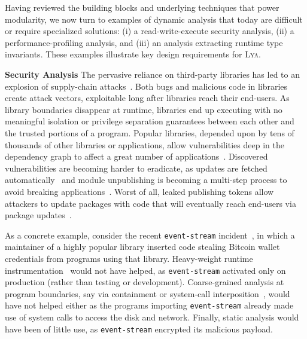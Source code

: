 \documentclass[letterpaper,twocolumn,10pt]{article}
\newcommand{\heading}[1]{\vspace{2pt}\noindent\textbf{#1}\enspace}
\newcommand{\ttt}[1]{\texttt{#1}}
\newcommand{\sys}{{\scshape Lya}\xspace}
\begin{document}

Having reviewed the building blocks and underlying techniques that power modularity, we now turn to examples of dynamic analysis that today are difficult or require specialized solutions:
  (i) a read-write-execute security analysis,
  (ii) a performance-profiling analysis, and %
  (iii) an analysis extracting runtime type invariants.
These examples illustrate key design requirements for \sys.

\heading{Security Analysis}
The pervasive reliance on third-party libraries has led to an explosion of supply-chain attacks~\cite{long2015owasp, maass2016theory, snyk, lauinger2017thou}.
Both bugs and malicious code in libraries create attack vectors, exploitable long after libraries reach their end-users.
As library boundaries disappear at runtime, libraries end up executing with no meaningful isolation or privilege separation guarantees between each other and the trusted portions of a program.
Popular libraries, depended upon by tens of thousands of other libraries or applications, allow vulnerabilities deep in the dependency graph to affect a great number of applications~\cite{leftpad, npmstudy:19}.
Discovered vulnerabilities are becoming harder to eradicate, as updates are fetched automatically~\cite{npmFailure} and module unpublishing is becoming a multi-step process to avoid breaking applications~\cite{npmUnpublish}.
Worst of all, leaked publishing tokens allow attackers to update packages with code that will eventually reach end-users via package updates~\cite{eslint1}.

As a concrete example, consider the recent \ttt{event-stream} incident~\cite{es1, es2}, in which a maintainer of a highly popular library inserted code stealing Bitcoin wallet credentials from programs using that library.
Heavy-weight runtime instrumentation~\cite{jalangi} would not have helped, as \ttt{event-stream} activated only on production (rather than testing or development).
Coarse-grained analysis at program boundaries, say via containment or system-call interposition~\cite{systrace:03}, would have not helped either as the programs importing \ttt{event-stream} already made use of system calls to access the disk and network.
Finally, static analysis would have been of little use, as \ttt{event-stream} encrypted its malicious payload.
\end{document}
